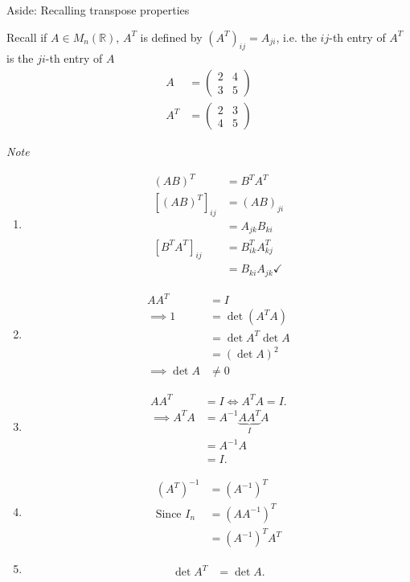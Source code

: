 \begin{aside}{Aside: Recalling transpose properties}

Recall if $A \in M_n(\mathbb{R})$, $A^T$ is defined by $(A^T)_{ij} = A_{ji}$, i.e. the $ij$-th entry of $A^T$ is the $ji$-th entry of $A$
\begin{align*}
    A &= \begin{pmatrix}2 & 4 \\3 & 5\end{pmatrix} \\
    A^T &= \begin{pmatrix}2 & 3 \\4 & 5\end{pmatrix}
\end{align*} 

\emph{Note}
\begin{enumerate}
    \item
    \begin{align*}
        (AB)^T &= B^T A^T \\
        [(AB)^T]_{ij} &= (AB)_{ji} \\
        &= A_{jk}B_{ki} \\
        [B^T A^T]_{ij} &= B^T_{ik} A^T_{kj} \\
        &= B_{ki} A_{jk} \checkmark
    \end{align*} 
    \item \begin{align*}
        A A^T &= I \\
        \implies 1 &= \det (A^T A) \\
        &= \det A^T \det A \\
        &= (\det A)^2 \\
        \implies \det A &\neq 0
    \end{align*}
    \item \begin{align*}
        A A^T &= I \iff A^T A = I. \\
        \implies A^T A &= A^{-1} \underbrace{A A^T}_I A \\
        &= A^{-1} A \\
        &= I.
    \end{align*} 
    \item
    \begin{align*}
        (A^T)^{-1} &= (A^{-1})^T \\
        \text{Since } I_n &= (A A^{-1})^T \\
        &= (A^{-1})^T A^T
    \end{align*} 
    \item \begin{align*}
        \det A^T &= \det A.
    \end{align*} 
\end{enumerate} 

\end{aside}

